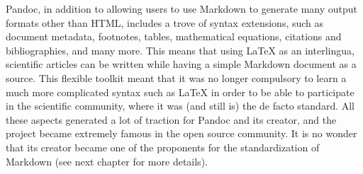 Pandoc, in addition to allowing users to use Markdown to generate many output formats other than HTML, includes a trove of syntax extensions,
such as document metadata, footnotes, tables, mathematical equations, citations and bibliographies, and many more. This means that using LaTeX
as an interlingua, scientific articles can be written while having a simple Markdown document as a source. This flexible toolkit meant that
it was no longer compulsory to learn a much more complicated syntax such as LaTeX in order to be able to participate in the scientific community,
where it was (and still is) the de facto standard. All these aspects generated a lot of traction for Pandoc and its creator, and the project
became extremely famous in the open source community. It is no wonder that its creator became one of the proponents for the standardization of
Markdown (see next chapter for more details).